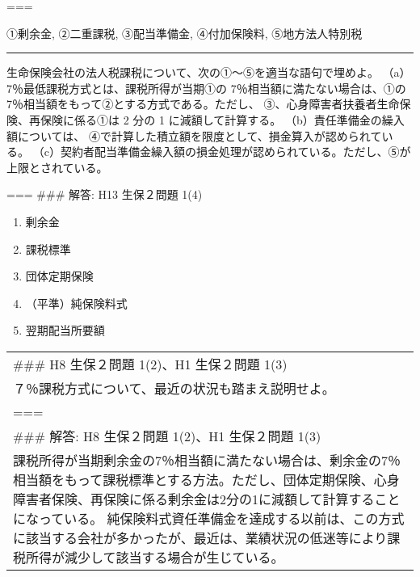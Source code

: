 \documentclass[report,gutter=10mm,fore-edge=10mm,uplatex,dvipdfmx]{jlreq}
\begin{document}
===


①剰余金, ②二重課税, ③配当準備金, ④付加保険料, ⑤地方法人特別税

\begin{center}\rule{0.5\linewidth}{0.5pt}\end{center}


生命保険会社の法人税課税について、次の①～⑤を適当な語句で埋めよ。
（a）7％最低課税方式とは、課税所得が当期①の
7％相当額に満たない場合は、①の
7％相当額をもって②とする方式である。ただし、
③、心身障害者扶養者生命保険、再保険に係る①は 2 分の 1
に減額して計算する。 （b）責任準備金の繰入額については、
④で計算した積立額を限度として、損金算入が認められている。
（c）契約者配当準備金繰入額の損金処理が認められている。ただし、⑤が上限とされている。

=== \#\#\# 解答: H13 生保２問題 1(4)

\begin{enumerate}
\tightlist
\item
  剰余金
\item
  課税標準
\item
  団体定期保険
\item
  （平準）純保険料式
\item
  翌期配当所要額
\end{enumerate}

\begin{longtable}[]{@{}l@{}}
\toprule
\endhead
\begin{minipage}[t]{0.07\columnwidth}\raggedright
\#\#\# H8 生保２問題 1(2)、H1 生保２問題 1(3)\strut
\end{minipage}\tabularnewline
\begin{minipage}[t]{0.07\columnwidth}\raggedright
７％課税方式について、最近の状況も踏まえ説明せよ。\strut
\end{minipage}\tabularnewline
\begin{minipage}[t]{0.07\columnwidth}\raggedright
===\strut
\end{minipage}\tabularnewline
\begin{minipage}[t]{0.07\columnwidth}\raggedright
\#\#\# 解答: H8 生保２問題 1(2)、H1 生保２問題 1(3)\strut
\end{minipage}\tabularnewline
\begin{minipage}[t]{0.07\columnwidth}\raggedright
課税所得が当期剰余金の7％相当額に満たない場合は、剰余金の7％相当額をもって課税標準とする方法。ただし、団体定期保険、心身障害者保険、再保険に係る剰余金は2分の1に減額して計算することになっている。
純保険料式資任準備金を達成する以前は、この方式に該当する会社が多かったが、最近は、業績状況の低迷等により課税所得が減少して該当する場合が生じている。\strut
\end{minipage}\tabularnewline
\bottomrule
\end{longtable}
\end{document}
